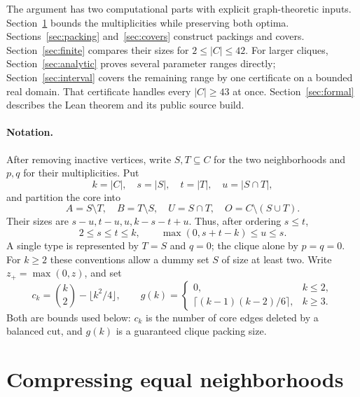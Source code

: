 \documentclass[11pt]{article}
\begin{document}
The argument has two computational parts with explicit graph-theoretic
inputs. Section~\ref{sec:compression} bounds the multiplicities while
preserving both optima. Sections~\ref{sec:packing} and~\ref{sec:covers}
construct packings and covers. Section~\ref{sec:finite} compares their
sizes for $2\leq |C|\leq42$. For larger cliques,
Section~\ref{sec:analytic} proves several parameter ranges directly;
Section~\ref{sec:interval} covers the remaining range by one certificate
on a bounded real domain. That certificate handles every $|C|\geq43$
at once. Section~\ref{sec:formal} describes the Lean theorem and its
public source build.

\paragraph{Notation.}
After removing inactive vertices, write $S,T\subseteq C$ for the
two neighborhoods and $p,q$ for their multiplicities. Put
\[
 k=|C|,\quad s=|S|,\quad t=|T|,\quad u=|S\cap T|,
\]
and partition the core into
\[
 A=S\setminus T,\quad B=T\setminus S,\quad U=S\cap T,
 \quad O=C\setminus(S\cup T).
\]
Their sizes are $s-u,t-u,u,k-s-t+u$. Thus, after ordering $s\leq t$,
\[
 2\leq s\leq t\leq k,\qquad \max(0,s+t-k)\leq u\leq s.
\]
A single type is represented by $T=S$ and $q=0$; the clique alone by
$p=q=0$. For $k\geq2$ these conventions allow a dummy set $S$ of size
at least two. Write $z_+=\max(0,z)$, and set
\[
 c_k=\binom{k}{2}-\lfloor k^2/4\rfloor,
 \qquad
 g(k)=\begin{cases}0,&k\leq2,\\
 \lceil(k-1)(k-2)/6\rceil,&k\geq3.
 \end{cases}
\]
Both are bounds used below: $c_k$ is the number of core edges deleted
by a balanced cut, and $g(k)$ is a guaranteed clique packing size.

\section{Compressing equal neighborhoods}\label{sec:compression}
\end{document}
